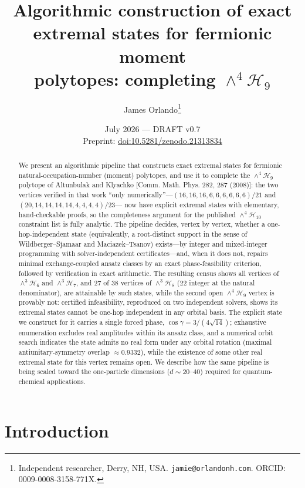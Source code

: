 \documentclass[11pt]{article}
\title{Algorithmic construction of exact extremal states for fermionic moment\\ polytopes: completing $\wedge^4\mathcal{H}_9$}
\author{James Orlando\thanks{Independent researcher, Derry, NH, USA.
\texttt{jamie@orlandonh.com}. ORCID: 0009-0008-3158-771X.}}
\date{July 2026 --- DRAFT v0.7 \\ \small Preprint: \href{https://doi.org/10.5281/zenodo.21313834}{doi:10.5281/zenodo.21313834}}
\begin{document}
\maketitle

\begin{abstract}
We present an algorithmic pipeline that constructs exact extremal states for
fermionic natural-occupation-number (moment) polytopes, and use it to complete
the $\wedge^4\mathcal{H}_9$ polytope of Altunbulak and Klyachko [Comm. Math.
Phys. 282, 287 (2008)]: the two vertices verified in that work ``only
numerically''---$(16,16,16,6,6,6,6,6,6)/21$ and $(20,14,14,14,14,4,4,4,4)/23$---%
now have explicit extremal states with elementary, hand-checkable proofs, so
the completeness argument for the published $\wedge^4\mathcal{H}_{10}$
constraint list is fully analytic. The pipeline decides, vertex by vertex,
whether a one-hop-independent state (equivalently, a root-distinct support in
the sense of Wildberger--Sjamaar and Maciazek--Tsanov) exists---by integer and
mixed-integer programming with solver-independent certificates---and, when it
does not, repairs minimal exchange-coupled ansatz classes by an exact
phase-feasibility criterion, followed by verification in exact arithmetic. The
resulting census shows all vertices of $\wedge^3\mathcal{H}_6$ and
$\wedge^3\mathcal{H}_7$, and $27$ of $38$ vertices of $\wedge^3\mathcal{H}_8$
($22$ integer at the natural denominator), are attainable by such states, while
the second open $\wedge^4\mathcal{H}_9$ vertex is provably not: certified
infeasibility, reproduced on two independent solvers, shows its extremal
states cannot be one-hop independent in any orbital basis. The explicit state we
construct for it carries a single forced phase, $\cos\gamma = 3/(4\sqrt{14})$;
exhaustive enumeration excludes real amplitudes within its ansatz class, and a
numerical orbit search indicates the state admits no real form under any
orbital rotation (maximal antiunitary-symmetry overlap $\approx 0.9332$),
while the existence of some other real extremal state for this vertex remains
open. We describe how the same pipeline is being scaled toward the
one-particle dimensions ($d\sim20$--$40$) required for quantum-chemical
applications.
\end{abstract}

\section{Introduction}
\end{document}
